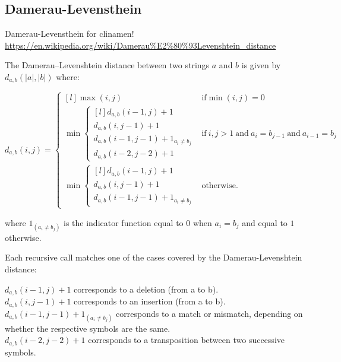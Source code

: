 \subsection{Damerau-Levensthein}

\begin{fcom}
  Damerau-Levensthein for clinamen!
  \url{https://en.wikipedia.org/wiki/Damerau%E2%80%93Levenshtein_distance}
\end{fcom}

The Damerau–Levenshtein distance between two strings $a$ and $b$ is given by $d_{a,b}(|a|,|b|)$ where:

\begin{equation}
  d_{a,b}(i,j)=\left\{\begin{matrix*}[l]%
  \max(i,j) & \textrm{if}\min(i,j)=0\\
  \min\left\{\begin{matrix*}[l]%
  d_{a,b}(i-1,j)+1\\
  d_{a,b}(i,j-1)+1\\
  d_{a,b}(i-1,j-1)+1_{a_i\neq b_j}\\
  d_{a,b}(i-2,j-2)+1
  \end{matrix*}\right. & \textrm{if}\ i,j > 1 \ \textrm{and}\ a_i = b_{j-1}\ \textrm{and}\ a_{i-1} = b_j\\
  \min\left\{\begin{matrix*}[l]%
  d_{a,b}(i-1,j)+1\\
  d_{a,b}(i,j-1)+1\\
  d_{a,b}(i-1,j-1)+1_{a_i\neq b_j}
\end{matrix*}\right. & \textrm{otherwise.}
  \end{matrix*}\right.
  \label{eq:DL}
\end{equation}

where $1_{(a_i \neq b_j)}$ is the indicator function equal to $0$ when $a_i = b_j$ and equal to $1$ otherwise.

Each recursive call matches one of the cases covered by the Dame\-rau-Leven\-shtein distance:

$d_{a,b}(i-1,j) + 1$ corresponds to a deletion (from a to b).\\
$d_{a,b}(i,j-1) + 1$ corresponds to an insertion (from a to b).\\
$d_{a,b}(i-1,j-1) + 1_{(a_i \neq b_j)}$  corresponds to a match or mismatch, depending on whether the respective symbols are the same.\\
$d_{a,b}(i-2,j-2) + 1$  corresponds to a transposition between two successive symbols.





